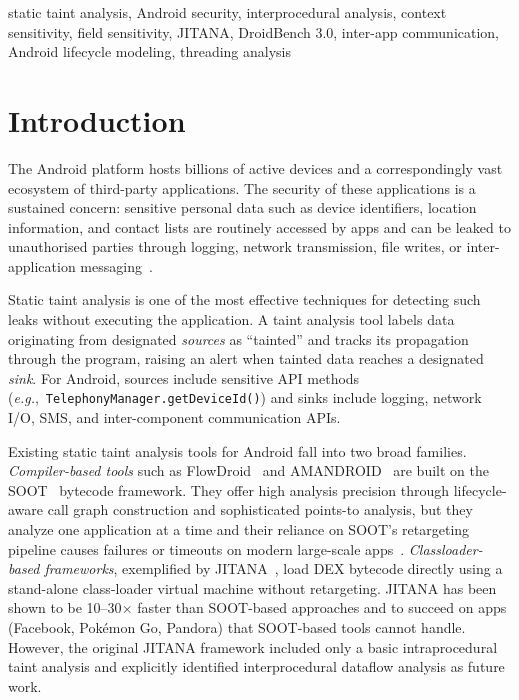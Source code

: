 \documentclass[conference]{IEEEtran}
\begin{document}
\begin{IEEEkeywords}
static taint analysis, Android security, interprocedural analysis, context
sensitivity, field sensitivity, JITANA, DroidBench 3.0, inter-app
communication, Android lifecycle modeling, threading analysis
\end{IEEEkeywords}

\section{Introduction}

The Android platform hosts billions of active devices and a correspondingly vast
ecosystem of third-party applications. The security of these applications is a
sustained concern: sensitive personal data such as device identifiers, location
information, and contact lists are routinely accessed by apps and can be leaked
to unauthorised parties through logging, network transmission, file writes, or
inter-application messaging~\cite{flowdroid,amandroid}.

Static taint analysis is one of the most effective techniques for detecting such
leaks without executing the application. A taint analysis tool labels data
originating from designated \emph{sources} as ``tainted'' and tracks its
propagation through the program, raising an alert when tainted data reaches a
designated \emph{sink}. For Android, sources include sensitive API methods
(\textit{e.g.},~\texttt{TelephonyManager.getDeviceId()}) and sinks include
logging, network I/O, SMS, and inter-component communication APIs.

Existing static taint analysis tools for Android fall into two broad families.
\emph{Compiler-based tools} such as FlowDroid~\cite{flowdroid} and
AMANDROID~\cite{amandroid} are built on the SOOT~\cite{soot} bytecode
framework. They offer high analysis precision through lifecycle-aware call graph
construction and sophisticated points-to analysis, but they analyze one
application at a time and their reliance on SOOT's retargeting pipeline causes
failures or timeouts on modern large-scale apps~\cite{jitana}.
\emph{Classloader-based frameworks}, exemplified by JITANA~\cite{jitana}, load
DEX bytecode directly using a stand-alone class-loader virtual machine without
retargeting. JITANA has been shown to be 10--30$\times$ faster than SOOT-based
approaches and to succeed on apps (Facebook, Pok\'{e}mon Go, Pandora) that
SOOT-based tools cannot handle. However, the original JITANA framework included
only a basic intraprocedural taint analysis and explicitly identified
interprocedural dataflow analysis as future work.
\end{document}

